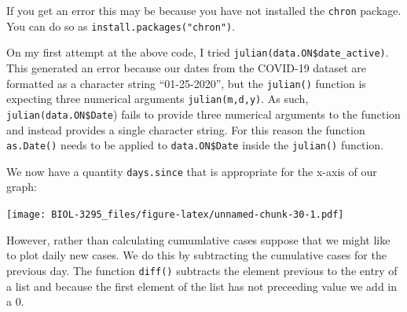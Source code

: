 \documentclass[]{book}
\newenvironment{Shaded}{\begin{snugshade}}{\end{snugshade}}
\newcommand{\KeywordTok}[1]{\textcolor[rgb]{0.13,0.29,0.53}{\textbf{{#1}}}}
\newcommand{\DataTypeTok}[1]{\textcolor[rgb]{0.13,0.29,0.53}{{#1}}}
\newcommand{\DecValTok}[1]{\textcolor[rgb]{0.00,0.00,0.81}{{#1}}}
\newcommand{\StringTok}[1]{\textcolor[rgb]{0.31,0.60,0.02}{{#1}}}
\newcommand{\NormalTok}[1]{{#1}}
\begin{document}
If you get an error this may be because you have not installed the
\texttt{chron} package. You can do so as
\texttt{install.packages("chron")}.

On my first attempt at the above code, I tried
\texttt{julian(data.ON\$date\_active)}. This generated an error because
our dates from the COVID-19 dataset are formatted as a character string
``01-25-2020'', but the \texttt{julian()} function is expecting three
numerical arguments \texttt{julian(m,d,y)}. As such,
\texttt{julian(data.ON\$Date}) fails to provide three numerical
arguments to the function and instead provides a single character
string. For this reason the function \texttt{as.Date()} needs to be
applied to \texttt{data.ON\$Date} inside the \texttt{julian()} function.

We now have a quantity \texttt{days.since} that is appropriate for the
x-axis of our graph:

\begin{Shaded}
\end{Shaded}

\texttt{[image: BIOL-3295\_files/figure-latex/unnamed-chunk-30-1.pdf]}

However, rather than calculating cumumlative cases suppose that we might
like to plot daily new cases. We do this by subtracting the cumulative
cases for the previous day. The function \texttt{diff()} subtracts the
element previous to the entry of a list and because the first element of
the list has not preceeding value we add in a 0.

\begin{Shaded}
\end{Shaded}
\end{document}
